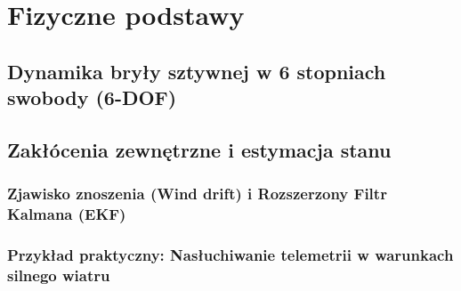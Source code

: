 \chapter{Fizyczne podstawy}
\section{Dynamika bryły sztywnej w 6 stopniach swobody (6-DOF)}

\section{Zakłócenia zewnętrzne i estymacja stanu}
\subsection{Zjawisko znoszenia (Wind drift) i Rozszerzony Filtr Kalmana (EKF)}
\subsection{Przykład praktyczny: Nasłuchiwanie telemetrii w warunkach silnego wiatru}

